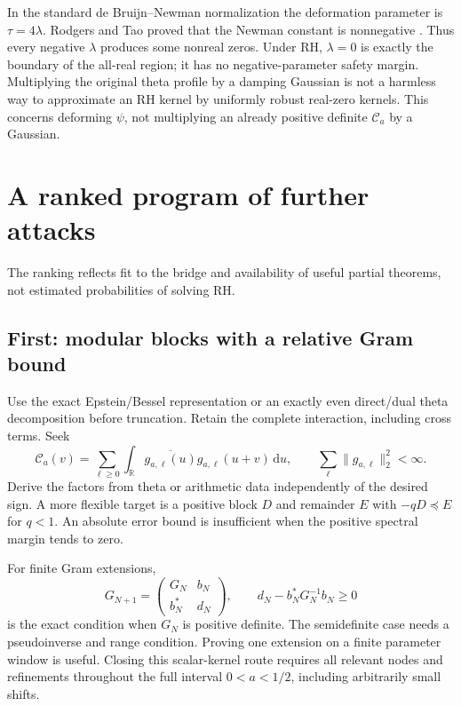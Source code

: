 \documentclass[11pt,letterpaper]{article}
\numberwithin{equation}{section}
\theoremstyle{remark}\newtheorem{remark}[proposition]{Remark}
\newcommand{\R}{\mathbb R}
\newcommand{\dd}{\,\mathrm d}
\newcommand{\calC}{\mathcal C}
\begin{document}
In the standard de Bruijn--Newman normalization the deformation parameter is
$\tau=4\lambda$. Rodgers and Tao proved that the Newman constant is nonnegative \cite{rodgersTao}. Thus every negative $\lambda$ produces some nonreal zeros. Under RH, $\lambda=0$ is exactly the boundary of the all-real region; it has no negative-parameter safety margin. Multiplying the original theta profile by a damping Gaussian is not a harmless way to approximate an RH kernel by uniformly robust real-zero kernels. This concerns deforming $\psi$, not multiplying an already positive definite $\calC_a$ by a Gaussian.

\section{A ranked program of further attacks}
The ranking reflects fit to the bridge and availability of useful partial theorems, not estimated probabilities of solving RH.

\subsection{First: modular blocks with a relative Gram bound}
Use the exact Epstein/Bessel representation or an exactly even direct/dual theta decomposition before truncation. Retain the complete interaction, including cross terms. Seek
\begin{equation}
 \calC_a(v)=\sum_{\ell\ge0}
       \int_{\R}\overline{g_{a,\ell}(u)}g_{a,\ell}(u+v)\dd u,
 \qquad \sum_\ell\|g_{a,\ell}\|_2^2<\infty.
 \label{eq:desired}
\end{equation}
Derive the factors from theta or arithmetic data independently of the desired sign. A more flexible target is a positive block $D$ and remainder $E$ with
$-qD\preceq E$ for $q<1$. An absolute error bound is insufficient when the positive spectral margin tends to zero.

For finite Gram extensions,
\[
 G_{N+1}=\begin{pmatrix}G_N&b_N\\b_N^*&d_N\end{pmatrix},
 \qquad d_N-b_N^*G_N^{-1}b_N\ge0
\]
is the exact condition when $G_N$ is positive definite. The semidefinite case needs a pseudoinverse and range condition. Proving one extension on a finite parameter window is useful. Closing this scalar-kernel route requires all relevant nodes and refinements throughout the full interval $0<a<1/2$, including arbitrarily small shifts.
\end{document}
